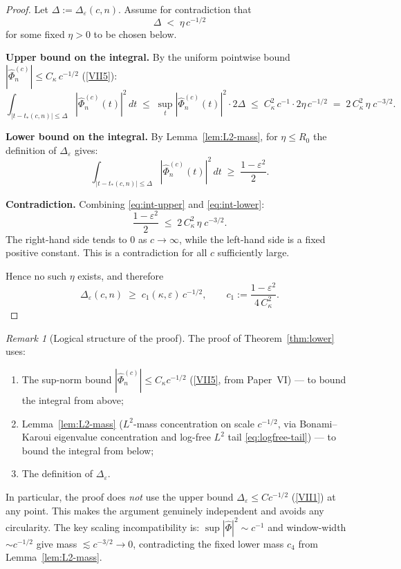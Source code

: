 \documentclass[12pt,a4paper]{amsart}
\theoremstyle{definition}
\theoremstyle{remark}
\newtheorem{remark}[theorem]{Remark}
\newcommand{\Phihat}{\widehat{\Phi}}
\newcommand{\tstar}{t_*(c,n)}
\begin{document}
\begin{proof}
Let $\Delta:=\Delta_\varepsilon(c,n)$.
Assume for contradiction that
\begin{equation}\label{eq:contra}
  \Delta \;<\; \eta\,c^{-1/2}
\end{equation}
for some fixed $\eta > 0$ to be chosen below.

\textbf{Upper bound on the integral.}
By the uniform pointwise bound
$|\Phihat_n^{(c)}| \le C_\kappa\,c^{-1/2}$
(\ref{VII5}):
\begin{equation}\label{eq:int-upper}
  \int_{|t - \tstar| \le \Delta}
  |\Phihat_n^{(c)}(t)|^2\,dt
  \;\le\;
  \sup_t|\Phihat_n^{(c)}(t)|^2 \cdot 2\Delta
  \;\le\;
  C_\kappa^2\,c^{-1} \cdot 2\eta\,c^{-1/2}
  \;=\;
  2\,C_\kappa^2\,\eta\;c^{-3/2}.
\end{equation}

\textbf{Lower bound on the integral.}
By Lemma~\ref{lem:L2-mass}, for $\eta \le R_0$
the definition of $\Delta_\varepsilon$ gives:
\begin{equation}\label{eq:int-lower}
  \int_{|t - \tstar| \le \Delta}
  |\Phihat_n^{(c)}(t)|^2\,dt
  \;\ge\;
  \frac{1-\varepsilon^2}{2}.
\end{equation}

\textbf{Contradiction.}
Combining \eqref{eq:int-upper} and \eqref{eq:int-lower}:
\[
  \frac{1-\varepsilon^2}{2}
  \;\le\;
  2\,C_\kappa^2\,\eta\;c^{-3/2}.
\]
The right-hand side tends to $0$ as $c\to\infty$,
while the left-hand side is a fixed positive constant.
This is a contradiction for all $c$ sufficiently large.

Hence no such $\eta$ exists, and therefore
\[
  \Delta_\varepsilon(c,n)
  \;\ge\;
  c_1(\kappa,\varepsilon)\,c^{-1/2},
  \qquad
  c_1 := \frac{1-\varepsilon^2}{4\,C_\kappa^2}.
\]
\end{proof}

\begin{remark}[Logical structure of the proof]
\label{rem:lower-logic}
The proof of Theorem~\ref{thm:lower} uses:
\begin{enumerate}[\rm(a)]
\item The sup-norm bound
      $|\Phihat_n^{(c)}|\le C_\kappa c^{-1/2}$
      (\ref{VII5}, from Paper~VI) --- to bound
      the integral from above;
\item Lemma~\ref{lem:L2-mass}
      ($L^2$-mass concentration on scale $c^{-1/2}$,
      via Bonami--Karoui eigenvalue concentration
      \cite{BonamiKaroui2014} and log-free $L^2$ tail
      \eqref{eq:logfree-tail})
      --- to bound the integral from below;
\item The definition of $\Delta_\varepsilon$.
\end{enumerate}
In particular, the proof does \emph{not} use the
upper bound $\Delta_\varepsilon \le C c^{-1/2}$
(\ref{VII1}) at any point.
This makes the argument genuinely independent
and avoids any circularity.
The key scaling incompatibility is:
$\sup|\Phihat|^2 \sim c^{-1}$ and
window-width $\sim c^{-1/2}$ give
mass $\lesssim c^{-3/2} \to 0$,
contradicting the fixed lower mass $c_4$
from Lemma~\ref{lem:L2-mass}.
\end{remark}
\end{document}

